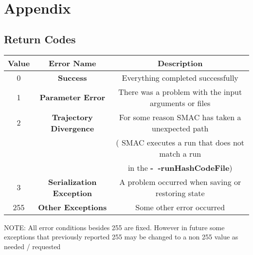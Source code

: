\documentclass[11pt,letterpaper,oneside]{article}
\begin{document}


\renewcommand{\bibsection}{\section{References}}




\section{Appendix}
\subsection{Return Codes}

\begin{table}[h]
\begin{tabular}{| c | c | c |}
\hline
Value & Error Name & Description \\
\hline
\hline
0 & \textbf{Success} & Everything completed successfully \\
\hline
1 & \textbf{Parameter Error} & There was a problem with the input arguments or files  \\
\hline
2 & \textbf{Trajectory Divergence} & For some reason SMAC has taken a unexpected path \\

& & (\eg{} SMAC executes a run that does not match a run \\
& & in the \textbf{-~$\!\!$-runHashCodeFile}) \\
\hline
3 & \textbf{Serialization Exception} & A problem occurred when saving or restoring state \\
\hline
255 & \textbf{Other Exceptions} & Some other error occurred \\
\hline
\end{tabular}
\end{table}

\textsc{NOTE:} All error conditions besides 255 are fixed. However in future some exceptions that previously reported 255 may be changed to a non 255 value as needed / requested
\\
\\
\\
\\
\\
\\
\end{document}

